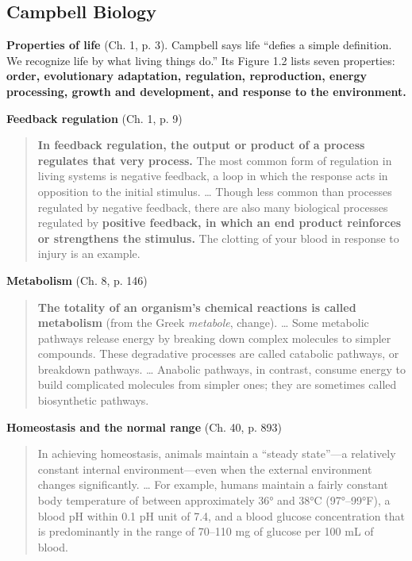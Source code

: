 \documentclass[11pt,letterpaper]{article}
\begin{document}
\subsection{Campbell Biology}

\textbf{Properties of life} (Ch. 1, p. 3). Campbell says life ``defies a simple definition. We recognize life by what living things do.'' Its Figure 1.2 lists seven properties: \textbf{order, evolutionary adaptation, regulation, reproduction, energy processing, growth and development, and response to the environment.}

\textbf{Feedback regulation} (Ch. 1, p. 9)

\begin{quote}
\textbf{In feedback regulation, the output or product of a process regulates that very process.} The most common form of regulation in living systems is negative feedback, a loop in which the response acts in opposition to the initial stimulus. \dots{} Though less common than processes regulated by negative feedback, there are also many biological processes regulated by \textbf{positive feedback, in which an end product reinforces or strengthens the stimulus.} The clotting of your blood in response to injury is an example.
\end{quote}

\textbf{Metabolism} (Ch. 8, p. 146)

\begin{quote}
\textbf{The totality of an organism's chemical reactions is called metabolism} (from the Greek \emph{metabole}, change). \dots{} Some metabolic pathways release energy by breaking down complex molecules to simpler compounds. These degradative processes are called catabolic pathways, or breakdown pathways. \dots{} Anabolic pathways, in contrast, consume energy to build complicated molecules from simpler ones; they are sometimes called biosynthetic pathways.
\end{quote}

\textbf{Homeostasis and the normal range} (Ch. 40, p. 893)

\begin{quote}
In achieving homeostasis, animals maintain a ``steady state''—a relatively constant internal environment—even when the external environment changes significantly. \dots{} For example, humans maintain a fairly constant body temperature of between approximately 36° and 38°C (97°–99°F), a blood pH within 0.1 pH unit of 7.4, and a blood glucose concentration that is predominantly in the range of 70–110 mg of glucose per 100 mL of blood.
\end{quote}
\end{document}
